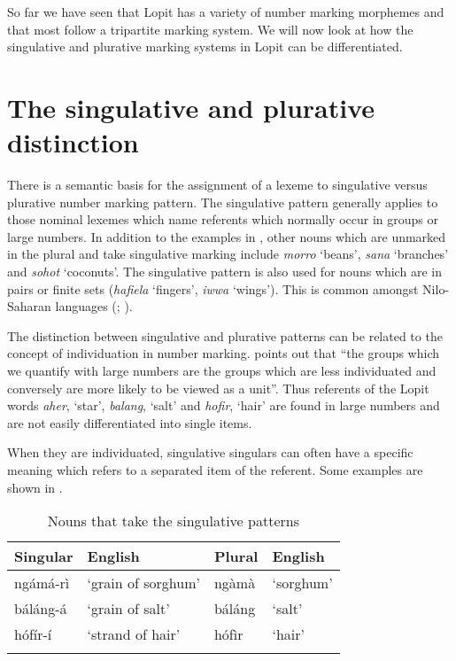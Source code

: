 \documentclass[output=paper]{langsci/langscibook}
\begin{document}
So far we have seen that Lopit has a variety of number marking morphemes and that most follow a tripartite marking system. We will now look at how the singulative and plurative marking systems in Lopit can be differentiated.

\section{The singulative and plurative distinction}\label{sec:moodie:3}

There is a semantic basis for the assignment of a lexeme to singulative versus plurative number marking pattern. The singulative pattern generally applies to those nominal lexemes which name referents which normally occur in groups or large numbers. In addition to the examples in , other nouns which are unmarked in the plural and take singulative marking include \textit{morro} ‘beans’, \textit{sana} ‘branches’ and \textit{sohot} ‘coconuts’. The singulative pattern is also used for nouns which are in pairs or finite sets (\textit{hafiela} ‘fingers’, \textit{iwwa} ‘wings’). This is common amongst Nilo-Saharan languages (\citealt[216]{Dimmendaal2000}; \citealt[119]{Creisselsetal2008}).

The distinction between singulative and plurative patterns can be related to the concept of individuation in number marking. \citet[217]{Corbett2000} points out that “the groups which we quantify with large numbers are the groups which are less individuated and conversely are more likely to be viewed as a unit”. Thus referents of the Lopit words \textit{aher}, ‘star’, \textit{balang}, ‘salt’ and \textit{hofir}, ‘hair’ are found in large numbers and are not easily differentiated into single items.

When they are individuated, singulative singulars can often have a specific meaning which refers to a separated item of the referent.  Some examples are shown in . 

\begin{table}
\begin{tabularx}{\textwidth}{XlXX}
\lsptoprule

  {Singular} &   {English} &   {Plural} &   {English}\\ 
\midrule
 ngámá-rì &  ‘grain of sorghum’ &  ngàmà &  ‘sorghum’\\
 báláng-á &  ‘grain of salt’ &  báláng &  ‘salt’\\
 hófír-í &  ‘strand of hair’ &  hófìr &  ‘hair’\\
\lspbottomrule
\end{tabularx}
\caption{Nouns that take the singulative patterns}
\label{tab:moodie:6}
\end{table}
\end{document}
